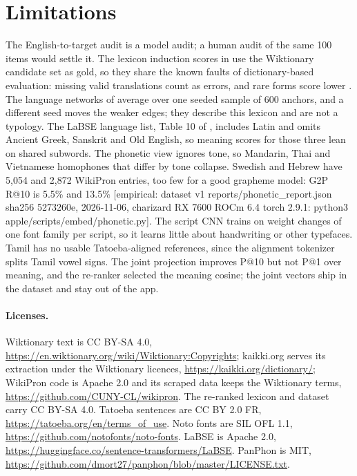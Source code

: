 \documentclass[11pt]{article}
\newcommand{\tg}[1]{\textcolor{bucketgray}{\footnotesize #1}}
\begin{document}
\section{Limitations}
\label{sec:limitations}

The English-to-target audit is a model audit; a human audit of the same 100 items would settle it. The lexicon induction scores in  use the Wiktionary candidate set as gold, so they share the known faults of dictionary-based evaluation: missing valid translations count as errors, and rare forms score lower \cite{kementchedjhieva2019lost,czarnowska2019longtail,glavas2019evaluate}. The language networks of  average over one seeded sample of 600 anchors, and a different seed moves the weaker edges; they describe this lexicon and are not a typology. The LaBSE language list, Table 10 of \cite{feng2020labse}, includes Latin and omits Ancient Greek, Sanskrit and Old English, so meaning scores for those three lean on shared subwords. The phonetic view ignores tone, so Mandarin, Thai and Vietnamese homophones that differ by tone collapse. Swedish and Hebrew have 5,054 and 2,872 WikiPron entries, too few for a good grapheme model: G2P R@10 is 5.5\% and 13.5\% \tg{[empirical: dataset v1 reports/phonetic\_report.json sha256 5273260e, 2026-11-06, charizard RX 7600 ROCm 6.4 torch 2.9.1: python3 apple/scripts/embed/phonetic.py]}. The script CNN trains on weight changes of one font family per script, so it learns little about handwriting or other typefaces. Tamil has no usable Tatoeba-aligned references, since the alignment tokenizer splits Tamil vowel signs. The joint projection improves P@10 but not P@1 over meaning, and the re-ranker selected the meaning cosine; the joint vectors ship in the dataset and stay out of the app.

\paragraph{Licenses.} Wiktionary text is CC BY-SA 4.0, \url{https://en.wiktionary.org/wiki/Wiktionary:Copyrights}; kaikki.org serves its extraction under the Wiktionary licences, \url{https://kaikki.org/dictionary/}; WikiPron code is Apache 2.0 and its scraped data keeps the Wiktionary terms, \url{https://github.com/CUNY-CL/wikipron}. The re-ranked lexicon and dataset carry CC BY-SA 4.0. Tatoeba sentences are CC BY 2.0 FR, \url{https://tatoeba.org/en/terms_of_use}. Noto fonts are SIL OFL 1.1, \url{https://github.com/notofonts/noto-fonts}. LaBSE is Apache 2.0, \url{https://huggingface.co/sentence-transformers/LaBSE}. PanPhon is MIT, \url{https://github.com/dmort27/panphon/blob/master/LICENSE.txt}.
\end{document}
